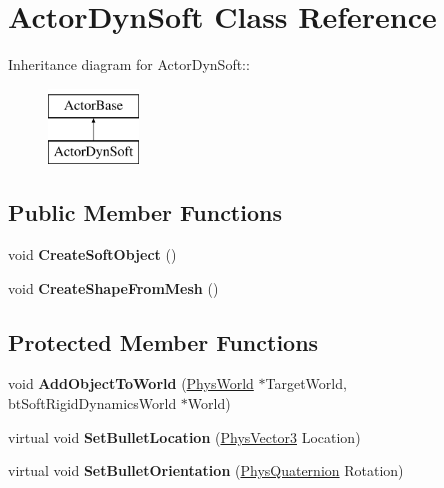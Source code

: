 \hypertarget{classActorDynSoft}{
\section{ActorDynSoft Class Reference}
\label{dc/de0/classActorDynSoft}
}
Inheritance diagram for ActorDynSoft::\begin{figure}[H]
\begin{center}
\leavevmode
\includegraphics[height=2cm]{dc/de0/classActorDynSoft}
\end{center}
\end{figure}
\subsection*{Public Member Functions}
\begin{DoxyCompactItemize}
\item 
\hypertarget{classActorDynSoft_a249bc0621b1d55ea0a9c7787605078d6}{
void {\bfseries CreateSoftObject} ()}
\label{dc/de0/classActorDynSoft_a249bc0621b1d55ea0a9c7787605078d6}

\item 
\hypertarget{classActorDynSoft_a979620b4ac447eb9875fb769d61a8092}{
void {\bfseries CreateShapeFromMesh} ()}
\label{dc/de0/classActorDynSoft_a979620b4ac447eb9875fb769d61a8092}

\end{DoxyCompactItemize}
\subsection*{Protected Member Functions}
\begin{DoxyCompactItemize}
\item 
\hypertarget{classActorDynSoft_ab56b961689401e16962d653b977e5fd6}{
void {\bfseries AddObjectToWorld} (\hyperlink{classPhysWorld}{PhysWorld} $\ast$TargetWorld, btSoftRigidDynamicsWorld $\ast$World)}
\label{dc/de0/classActorDynSoft_ab56b961689401e16962d653b977e5fd6}

\item 
\hypertarget{classActorDynSoft_aaf548f7849f59956c10d79420efafffb}{
virtual void {\bfseries SetBulletLocation} (\hyperlink{classPhysVector3}{PhysVector3} Location)}
\label{dc/de0/classActorDynSoft_aaf548f7849f59956c10d79420efafffb}

\item 
\hypertarget{classActorDynSoft_abbb2c795bd07b014239f157b440bc53d}{
virtual void {\bfseries SetBulletOrientation} (\hyperlink{classPhysQuaternion}{PhysQuaternion} Rotation)}
\label{dc/de0/classActorDynSoft_abbb2c795bd07b014239f157b440bc53d}

\end{DoxyCompactItemize}
